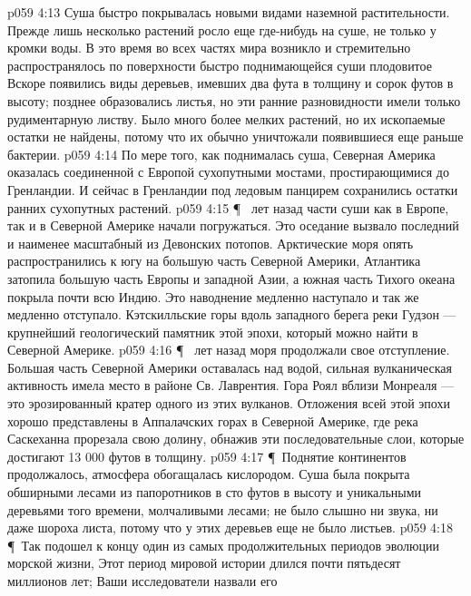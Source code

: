 \vs p059 4:13 Суша быстро покрывалась новыми видами наземной растительности. Прежде лишь несколько растений росло еще где\hyp{}нибудь на суше, не только у кромки воды. В это время во всех частях мира  возникло и стремительно распространялось по поверхности быстро поднимающейся суши плодовитое  Вскоре появились виды деревьев, имевших два фута в толщину и сорок футов в высоту; позднее образовались листья, но эти ранние разновидности имели только рудиментарную листву. Было много более мелких растений, но их ископаемые остатки не найдены, потому что их обычно уничтожали появившиеся еще раньше бактерии.
\vs p059 4:14 По мере того, как поднималась суша, Северная Америка оказалась соединенной с Европой сухопутными мостами, простирающимися до Гренландии. И сейчас в Гренландии под ледовым панцирем сохранились остатки ранних сухопутных растений.
\vs p059 4:15 \P\  лет назад части суши как в Европе, так и в Северной Америке начали погружаться. Это оседание вызвало последний и наименее масштабный из Девонских потопов. Арктические моря опять распространились к югу на большую часть Северной Америки, Атлантика затопила большую часть Европы и западной Азии, а южная часть Тихого океана покрыла почти всю Индию. Это наводнение медленно наступало и так же медленно отступало. Кэтскилльские горы вдоль западного берега реки Гудзон --- крупнейший геологический памятник этой эпохи, который можно найти в Северной Америке.
\vs p059 4:16 \P\  лет назад моря продолжали свое отступление. Большая часть Северной Америки оставалась над водой, сильная вулканическая активность имела место в районе Св. Лаврентия. Гора Роял вблизи Монреаля --- это эрозированный кратер одного из этих вулканов. Отложения всей этой эпохи хорошо представлены в Аппалачских горах в Северной Америке, где река Саскеханна прорезала свою долину, обнажив эти последовательные слои, которые достигают 13 000 футов в толщину.
\vs p059 4:17 \P\ Поднятие континентов продолжалось, атмосфера обогащалась кислородом. Суша была покрыта обширными лесами из папоротников в сто футов в высоту и уникальными деревьями того времени, молчаливыми лесами; не было слышно ни звука, ни даже шороха листа, потому что у этих деревьев еще не было листьев.
\vs p059 4:18 \P\ Так подошел к концу один из самых продолжительных периодов эволюции морской жизни,  Этот период мировой истории длился почти пятьдесят миллионов лет; Ваши исследователи назвали его 

